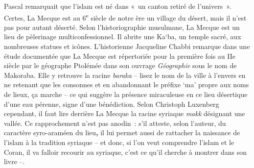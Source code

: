 Pascal remarquait que l'islam est né dans «~un canton retiré de
l'univers~». Certes, La Mecque est au 6\textsuperscript{e} siècle de
notre ère un village du désert, mais il n'est pas pour autant
déserté. Selon l'historiographie musulmane, La Mecque est un lieu de
pèlerinage multiconfessionnel. Il abrite une Ka`ba, un temple sacré, aux
nombreuses statues et icônes. L'historienne Jacqueline Chabbi remarque
dans une étude documentée que La Mecque
est répertoriée pour la première fois au IIe siècle par le géographe
Ptolémée dans son ouvrage \emph{Géographie} sous le nom de
Makoraba. Elle y
retrouve la racine \emph{baraka} -- lisez le nom de la ville à l'envers
en ne retenant que les consonnes et en abandonnant le préfixe `ma'
propre aux noms de lieux, ça marche -- ce qui suggère la présence
miraculeuse en ce lieu désertique d'une eau pérenne, signe d'une
bénédiction. Selon Christoph Luxenberg cependant, il faut lire derrière
La Mecque la racine syriaque \emph{makk} désignant une vallée. Ce
rapprochement n'est pas anodin~: s'il atteste, selon l'auteur, du
caractère syro-araméen du lieu\textbf{,} il lui permet aussi de
rattacher la naissance de l'islam à la tradition syriaque -- et donc, si l'on veut comprendre l'islam et
le Coran, il va falloir recourir au syriaque, c'est ce qu'il cherche à
montrer dans son livre --.

